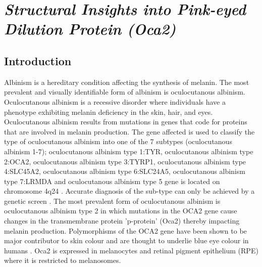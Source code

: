 
\chapter{\emph{Structural Insights into Pink-eyed Dilution Protein (Oca2)}}
\section{Introduction}

Albinism is a hereditary condition affecting the synthesis of melanin. The most prevalent and visually identifiable form of albinism is oculocutanous albinism. Oculocutanous albinism is a recessive disorder where individuals have a phenotype exhibiting melanin deficiency in the skin, hair, and eyes. Oculocutanous albinism results from mutations in genes that code for proteins that are involved in melanin production. The gene affected is used to classify the type of oculocutanous albinism  into one of the 7 subtypes (oculocutanous albinism 1-7); oculocutanous albinism  type 1:TYR, oculocutanous albinism type 2:OCA2, oculocutanous albinism type 3:TYRP1, oculocutanous albinism type 4:SLC45A2, oculocutanous albinism type 6:SLC24A5, oculocutanous albinism type 7:LRMDA and oculocutanous albinism type 5 gene is  located on chromosome 4q24 \cite{yang2019genetic}. Accurate diagnosis of the sub-type can only be achieved by a genetic screen \cite{arveiler2017clinical}. The most prevalent form of oculocutanous albinism is oculocutanous albinism type 2 in which mutations in the OCA2 gene cause changes in the transmembrane protein 'p-protein' (Oca2) thereby impacting melanin production. Polymorphisms of the OCA2 gene have been shown to be major contributor to skin colour \cite{lao2007signatures} and are thought to underlie blue eye colour in humans \cite{eiberg2008blue}. Oca2 is expressed in melanocytes and retinal pigment epithelium (RPE) where it is restricted to melanosomes.

